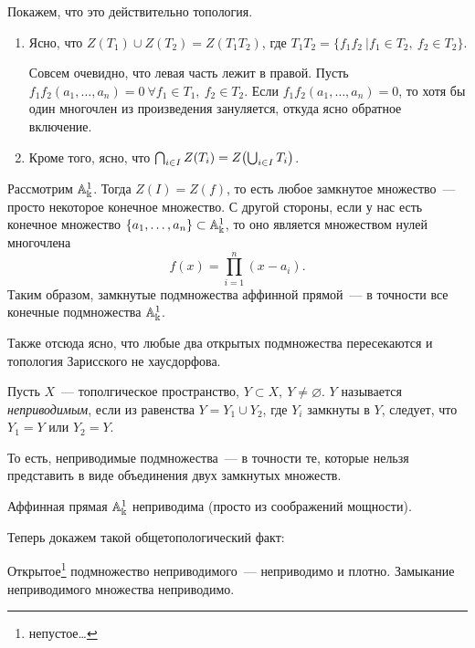 	Покажем, что это действительно топология. 

	\begin{enumerate}
		\item Ясно, что $Z(T_1) \cup Z(T_2) = Z(T_1 T_2)$, где $T_1 T_2 = \{ f_1 f_2 \ \vert f_1 \in T_2, \ f_2 \in T_2 \}$. 

		Совсем очевидно, что левая часть лежит в правой. Пусть $f_1f_2(a_1, \ldots, a_n) = 0 \ \forall f_1 \in T_1, \ f_2 \in T_2$. Если $f_1 f_2(a_1, \ldots, a_n) = 0$, то хотя бы один многочлен из произведения зануляется, откуда ясно обратное включение. 

		\item Кроме того, ясно, что  $\bigcap_{i \in I} Z(T_i) = Z\lr*{\bigcup_{i \in I} T_i }$.

	\end{enumerate}

	\begin{example}
		Рассмотрим $\AA_{\Bbbk}^1$. Тогда $Z(I) = Z(f)$, то есть любое замкнутое множество~--- просто некоторое конечное множество. С другой стороны, если у нас есть конечное множество $\{ a_1, \ldots, a_n \} \subset \AA_{\Bbbk}^1$, то оно является множеством нулей многочлена 
		\[
			f(x) = \prod_{i = 1}^{n} (x - a_i).
		\]
		Таким образом, замкнутые подмножества аффинной прямой~--- в точности все конечные подмножества $\AA_{\Bbbk}^1$.

		Также отсюда ясно, что любые два открытых подмножества пересекаются и топология Зарисского не хаусдорфова. 
	\end{example}

	\begin{definition} 
		Пусть $X$~--- тополгическое пространство, $Y \subset X, \ Y \neq \varnothing$. $Y$ называется \emph{неприводимым}, если из равенства $Y = Y_1 \cup Y_2$, где $Y_i$ замкнуты в $Y$, следует, что $Y_1 = Y$ или $Y_2 = Y$.

		То есть, неприводимые подмножества~--- в точности те, которые нельзя представить в виде объединения двух замкнутых множеств.
	\end{definition}

	\begin{example}
		Аффинная прямая $\AA_{\Bbbk}^1$ неприводима (просто из соображений мощности). 
	\end{example}

	Теперь докажем такой общетопологический факт:

	\begin{statement} 
		Открытое\footnote{непустое\ldots} подмножество неприводимого~--- неприводимо и плотно. Замыкание неприводимого множества неприводимо. 
	\end{statement}

